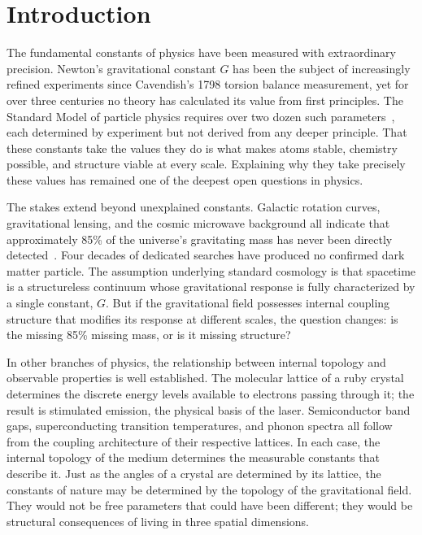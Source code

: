 \documentclass[aps,prd,preprint,superscriptaddress,showpacs,preprintnumbers,amsmath,amssymb,nofootinbib]{revtex4-2}
\begin{document}

\maketitle

\section{Introduction}
\label{sec:intro}

The fundamental constants of physics have been measured with extraordinary precision. Newton's gravitational constant $G$ has been the subject of increasingly refined experiments since Cavendish's 1798 torsion balance measurement, yet for over three centuries no theory has calculated its value from first principles. The Standard Model of particle physics requires over two dozen such parameters~\cite{pdg2024}, each determined by experiment but not derived from any deeper principle. That these constants take the values they do is what makes atoms stable, chemistry possible, and structure viable at every scale. Explaining why they take precisely these values has remained one of the deepest open questions in physics.

The stakes extend beyond unexplained constants. Galactic rotation curves, gravitational lensing, and the cosmic microwave background all indicate that approximately 85\% of the universe's gravitating mass has never been directly detected~\cite{pdg2024}. Four decades of dedicated searches have produced no confirmed dark matter particle. The assumption underlying standard cosmology is that spacetime is a structureless continuum whose gravitational response is fully characterized by a single constant, $G$. But if the gravitational field possesses internal coupling structure that modifies its response at different scales, the question changes: is the missing 85\% missing mass, or is it missing structure?

In other branches of physics, the relationship between internal topology and observable properties is well established. The molecular lattice of a ruby crystal determines the discrete energy levels available to electrons passing through it; the result is stimulated emission, the physical basis of the laser. Semiconductor band gaps, superconducting transition temperatures, and phonon spectra all follow from the coupling architecture of their respective lattices. In each case, the internal topology of the medium determines the measurable constants that describe it. Just as the angles of a crystal are determined by its lattice, the constants of nature may be determined by the topology of the gravitational field. They would not be free parameters that could have been different; they would be structural consequences of living in three spatial dimensions.
\end{document}

